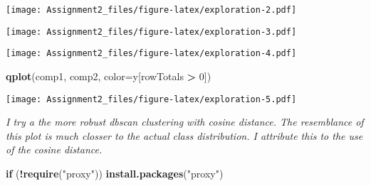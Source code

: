 \documentclass[]{article}
\newenvironment{Shaded}{\begin{snugshade}}{\end{snugshade}}
\newcommand{\ControlFlowTok}[1]{\textcolor[rgb]{0.13,0.29,0.53}{\textbf{#1}}}
\newcommand{\DataTypeTok}[1]{\textcolor[rgb]{0.13,0.29,0.53}{#1}}
\newcommand{\DecValTok}[1]{\textcolor[rgb]{0.00,0.00,0.81}{#1}}
\newcommand{\KeywordTok}[1]{\textcolor[rgb]{0.13,0.29,0.53}{\textbf{#1}}}
\newcommand{\NormalTok}[1]{#1}
\newcommand{\OperatorTok}[1]{\textcolor[rgb]{0.81,0.36,0.00}{\textbf{#1}}}
\newcommand{\StringTok}[1]{\textcolor[rgb]{0.31,0.60,0.02}{#1}}
\begin{document}
\begin{Shaded}
\end{Shaded}

\texttt{[image: Assignment2\_files/figure-latex/exploration-2.pdf]}

\begin{Shaded}
\end{Shaded}

\texttt{[image: Assignment2\_files/figure-latex/exploration-3.pdf]}

\begin{Shaded}
\end{Shaded}

\texttt{[image: Assignment2\_files/figure-latex/exploration-4.pdf]}

\begin{Shaded}
\begin{Highlighting}[]
\KeywordTok{qplot}\NormalTok{(comp1, comp2, }\DataTypeTok{color=}\NormalTok{y[rowTotals }\OperatorTok{>}\StringTok{ }\DecValTok{0}\NormalTok{])}
\end{Highlighting}
\end{Shaded}

\texttt{[image: Assignment2\_files/figure-latex/exploration-5.pdf]}

\emph{I try a the more robust dbscan clustering with cosine distance.
The resemblance of this plot is much closser to the actual class
distribution. I attribute this to the use of the cosine distance.}

\begin{Shaded}
\begin{Highlighting}[]
\ControlFlowTok{if}\NormalTok{ (}\OperatorTok{!}\KeywordTok{require}\NormalTok{(}\StringTok{"proxy"}\NormalTok{)) }\KeywordTok{install.packages}\NormalTok{(}\StringTok{"proxy"}\NormalTok{)}
\end{Highlighting}
\end{Shaded}
\end{document}
